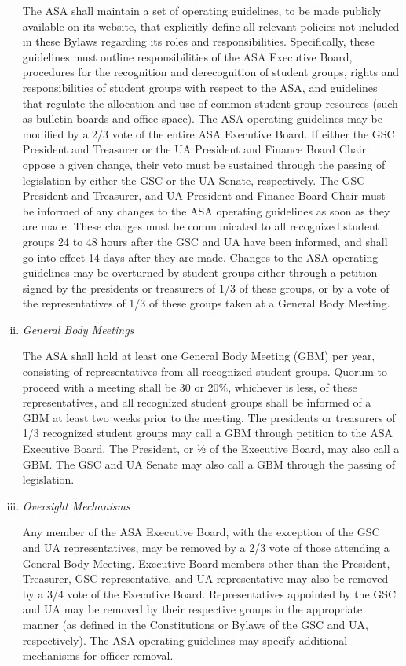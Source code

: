 \documentclass[12pt]{article}
\begin{document}
\begin{enumerate}[i.]
The ASA shall maintain a set of operating guidelines, to be made publicly available on its website, that
    explicitly define all relevant policies not included in these Bylaws regarding its roles and responsibilities.
Specifically, these guidelines must outline responsibilities of the ASA Executive Board, procedures for the
    recognition and derecognition of student groups, rights and responsibilities of student groups with respect to
    the ASA, and guidelines that regulate the allocation and use of common student group resources
    (such as bulletin boards and office space).
The ASA operating guidelines may be modified by a 2/3 vote of the entire ASA Executive Board.
If either the GSC President and Treasurer or the UA President and Finance Board Chair oppose a given change, their
    veto must be sustained through the passing of legislation by either the GSC or the UA Senate, respectively.
The GSC President and Treasurer, and UA President and Finance Board Chair must be informed of any changes to the
    ASA operating guidelines as soon as they are made.
These changes must be communicated to all recognized student groups 24 to 48 hours after the GSC and UA have been
    informed, and shall go into effect 14 days after they are made.
Changes to the ASA operating guidelines may be overturned by student groups either through a petition signed by
    the presidents or treasurers of 1/3 of these groups, or by a vote of the representatives of 1/3 of these
    groups taken at a General Body Meeting.

\item \textit{General Body Meetings} \label{gbms}

The ASA shall hold at least one General Body Meeting (GBM) per year, consisting of representatives from all
    recognized student groups.
Quorum to proceed with a meeting shall be 30 or 20\%, whichever is less, of these representatives, and all
    recognized student groups shall be informed of a GBM at least two weeks prior to the meeting.
The presidents or treasurers of 1/3 recognized student groups may call a GBM through petition to the
    ASA Executive Board. The President, or ½ of the Executive Board, may also call a GBM.
The GSC and UA Senate may also call a GBM through the passing of legislation.

\item \textit{Oversight Mechanisms}

Any member of the ASA Executive Board, with the exception of the GSC and UA representatives, may be removed by
    a 2/3 vote of those attending a General Body Meeting.
Executive Board members other than the President, Treasurer, GSC representative, and UA representative may
    also be removed by a 3/4 vote of the Executive Board.
Representatives appointed by the GSC and UA may be removed by their respective groups in the appropriate manner
    (as defined in the Constitutions or Bylaws of the GSC and UA, respectively).
The ASA operating guidelines may specify additional mechanisms for officer removal.


\end{enumerate}
\end{document}

